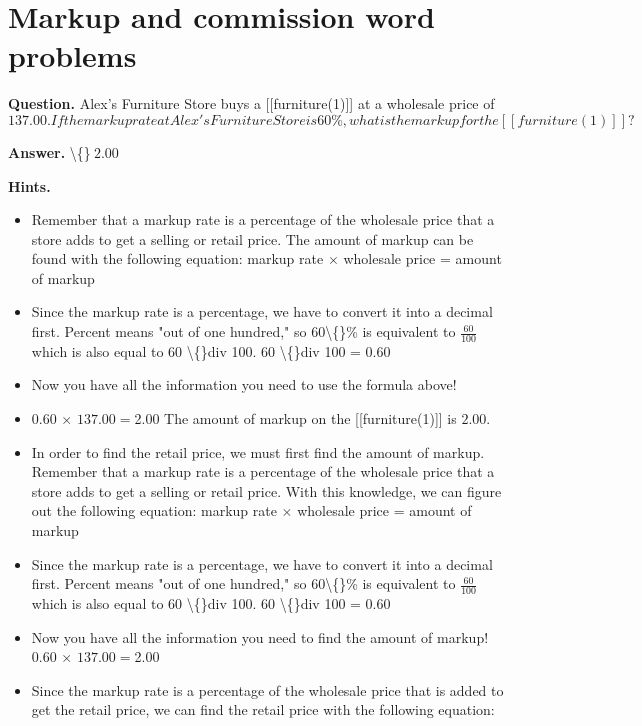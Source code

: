 \documentclass{article}
\begin{document}
\section*{Markup and commission word problems}
\textbf{Question.} Alex's Furniture Store buys a [[furniture(1)]]
                at a wholesale price of $137.00.
                If the markup rate at Alex's Furniture Store is 60\%,
                what is the markup for the [[furniture(1)]]?$

\textbf{Answer.} \textbackslash\{\}$\ 2.00$

\textbf{Hints.}
\begin{itemize}
  \item Remember that a markup rate is a percentage of the wholesale price that a store adds to get a selling or retail price. The amount of markup can be found with the following equation: 
                    markup rate $\times$ wholesale price = amount of markup
  \item Since the markup rate is a percentage, we have to convert it into a decimal first. Percent means "out of one hundred," so 60\textbackslash\{\}\% is equivalent to $\frac{60}{100}$ which is also equal to 60 \textbackslash\{\}div 100.
                    60 \textbackslash\{\}div 100 = 0.60
  \item Now you have all the information you need to use the formula above!
  \item 0.60 $\times$ $137.00 = $2.00
                    The amount of markup on the [[furniture(1)]] is $2.00.$
  \item In order to find the retail price, we must first find the amount of markup. Remember that a markup rate is a percentage of the wholesale price that a store adds to get a selling or retail price. With this knowledge, we can figure out the following equation:
                    markup rate $\times$ wholesale price = amount of markup
  \item Since the markup rate is a percentage, we have to convert it into a decimal first. Percent means "out of one hundred," so 60\textbackslash\{\}\% is equivalent to $\frac{60}{100}$ which is also equal to 60 \textbackslash\{\}div 100.
                    60 \textbackslash\{\}div 100 = 0.60
  \item Now you have all the information you need to find the amount of markup!
                    0.60 $\times$ $137.00 = $2.00
  \item Since the markup rate is a percentage of the wholesale price that is added to get the retail price, we can find the retail price with the following equation:

\end{itemize}
\end{document}
